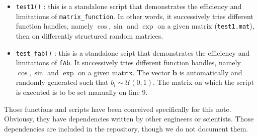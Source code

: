 \documentclass[11pt]{article}
\numberwithin{equation}{section}
\begin{document}
\begin{itemize}
    \item \texttt{test1()} : this is a standalone script that demonstrates the efficiency and limitations of \texttt{matrix\_function}. In other words, it successively tries different function handles, namely $\cos, \sin$ and $\exp$ on a given matrix (\texttt{test1.mat}), then on differently structured random matrices. 
    \item \texttt{test\_fab()} : this is a standalone scipt that demonstrates the efficiency and limitations of \texttt{fAb}. It successively tries different function handles, namely $\cos, \sin$ and $\exp$ on a given matrix. The vector $\mathbf{b}$ is automatically and randomly generated such that $b_i\sim\mathcal{U}(0,1)$. The matrix on which the script is executed is to be set manually on line 9. 
\end{itemize}
Those functions and scripts have been conceived specifically for this note. Obviousy, they have dependencies written by other engineers or scientists. Those dependencies are included in the repository, though we do not document them.
\end{document}
